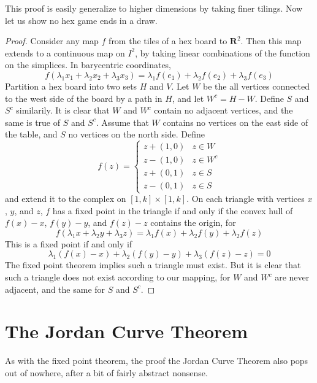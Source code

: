 \documentclass{article}
\theoremstyle{plain}
\begin{document}
This proof is easily generalize to higher dimensions by taking finer tilings. Now let us show no hex game ends in a draw.

\begin{proof}
    Consider any map $f$ from the tiles of a hex board to $\mathbf{R}^2$. Then this map extends to a continuous map on $I^2$, by taking linear combinations of the function on the simplices. In barycentric coordinates,
    \[ f(\lambda_1 x_1 + \lambda_2 x_2 + \lambda_3 x_3) = \lambda_1 f(e_1) + \lambda_2 f(e_2) + \lambda_3 f(e_3) \]
    Partition a hex board into two sets $H$ and $V$. Let $W$ be the all vertices connected to the west side of the board by a path in $H$, and let $W^c = H - W$. Define $S$ and $S^c$ similarily. It is clear that $W$ and $W^c$ contain no adjacent vertices, and the same is true of $S$ and $S^c$. Assume that $W$ contains no vertices on the east side of the table, and $S$ no vertices on the north side. Define
    \[ f(z) = \begin{cases} z + (1,0) & z \in W \\ z - (1,0) & z \in W^c \\ z + (0,1) & z \in S \\ z - (0,1) & z \in S \end{cases} \]
    and extend it to the complex on $[1,k] \times [1,k]$. On each triangle with vertices $x$, $y$, and $z$, $f$ has a fixed point in the triangle if and only if the convex hull of $f(x) - x$, $f(y) - y$, and $f(z) - z$ contains the origin, for
    \[ f(\lambda_1 x + \lambda_2 y + \lambda_3 z) = \lambda_1 f(x) + \lambda_2 f(y) + \lambda_2 f(z) \]
    This is a fixed point if and only if
    \[ \lambda_1 (f(x) - x) + \lambda_2 (f(y) - y) + \lambda_3 (f(z) - z) = 0 \]
    The fixed point theorem implies such a triangle must exist. But it is clear that such a triangle does not exist according to our mapping, for $W$ and $W^c$ are never adjacent, and the same for $S$ and $S^c$.
\end{proof}

\section{The Jordan Curve Theorem}

As with the fixed point theorem, the proof the Jordan Curve Theorem also pops out of nowhere, after a bit of fairly abstract nonsense.
\end{document}
